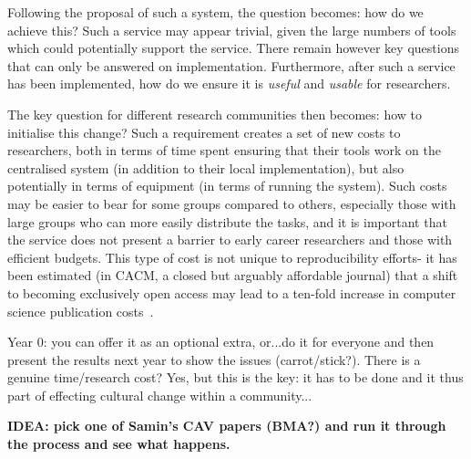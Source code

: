 \documentclass{llncs}
\begin{document}
Following the proposal of such a system, the question becomes: how do we achieve 
this? Such a service may appear trivial, given the large numbers of tools which
could potentially support the service. There remain however key questions that
can only be answered on implementation. Furthermore, after such a service has been
implemented, how do we ensure it is \emph{useful} and \emph{usable} for researchers.

The key question for different research communities then becomes: how to initialise 
this change? Such a requirement creates a set of new costs to researchers, both in 
terms of time spent ensuring that their tools work on the centralised system (in 
addition to their local implementation), but also potentially in terms of equipment
(in terms of running the system). Such costs may be easier to bear for some groups 
compared to others, especially those with large groups who can more easily distribute 
the tasks, and it is important that the service does not present a barrier to early 
career researchers and those with efficient budgets. This type of cost is not unique 
to reproducibility efforts- it has been estimated (in CACM, a closed but arguably 
affordable journal) that a shift to becoming exclusively open access may lead to a 
ten-fold increase in computer science publication costs~\cite{vardi-cacm-2014}.

Year 0: you can offer it as an optional extra, or...do it for everyone
and then present the results next year to show the issues
(carrot/stick?). There is a genuine time/research cost? Yes, but this
is the key: it has to be done and it thus part of effecting cultural
change within a community...


{\textbf{IDEA: pick one of Samin's CAV papers (BMA?) and run it through the process
and see what happens.}}
\end{document}
